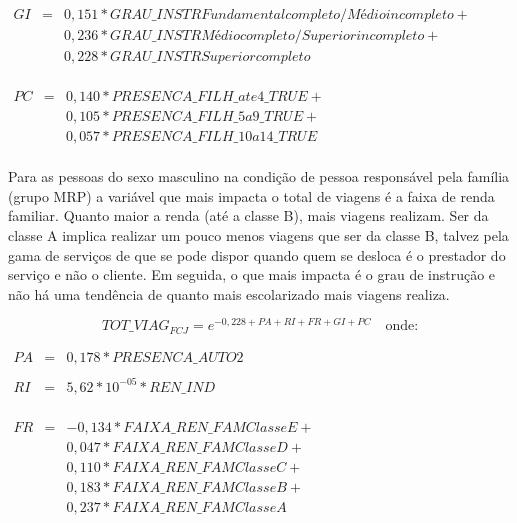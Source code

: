 \begin{math}
\begin{array} {rcl}
GI & = & 0,151*GRAU\_INSTRFundamental completo / Médio incompleto + \\
   &   & 0,236*GRAU\_INSTRMédio completo / Superior incompleto + \\
   &   & 0,228*GRAU\_INSTRSuperior completo \\  
\end{array}
\end{math}

\begin{math}
\begin{array} {rcl}
PC & = & 0,140*PRESENCA\_FILH\_ate4\_TRUE + \\
   &   & 0,105*PRESENCA\_FILH\_5a9\_TRUE +\\
   &   & 0,057*PRESENCA\_FILH\_10a14\_TRUE \\  
\end{array}
\end{math}

Para as pessoas do sexo masculino na condição de pessoa responsável pela família (grupo MRP) a variável que mais impacta o total de viagens é a faixa de renda familiar. 
Quanto maior a renda (até a classe B), mais viagens realizam.
Ser da classe A implica realizar um pouco menos viagens que ser da classe B, talvez pela gama de serviços de que se pode dispor quando quem se desloca é o prestador do serviço e não o cliente.
Em seguida, o que mais impacta é o grau de instrução e não há uma tendência de quanto mais escolarizado mais viagens realiza.

\begin{equation}\label{eq:quasi-poisson-GC} 
TOT\_VIAG _{FCJ}= e^{-0,228 + PA + RI + FR + GI + PC}
\quad \text{onde:}
\end{equation}

\begin{math}
\begin{array} {rcl}
PA & = & 0,178*PRESENCA\_AUTO2 \\  
   &   & \\
RI & = & 5,62*10^{-05}*REN\_IND \\  
\end{array}
\end{math}

\begin{math}
\begin{array} {rcl}
FR & = & -0,134*FAIXA\_REN\_FAMClasse E + \\
   &   & 0,047*FAIXA\_REN\_FAMClasse D + \\
   &   & 0,110*FAIXA\_REN\_FAMClasse C + \\
   &   & 0,183*FAIXA\_REN\_FAMClasse B + \\      
   &   & 0,237*FAIXA\_REN\_FAMClasse A \\
\end{array}
\end{math}

